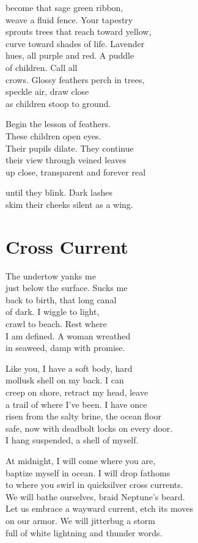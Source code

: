 \documentclass[twoside,10pt]{book}
\begin{document}
become that sage green ribbon,\\
weave a fluid fence. Your tapestry\\
sprouts trees that reach toward yellow,\\
curve toward shades of life. Lavender\\
hues, all purple and red. A puddle\\
of children. Call all\\
crows. Glossy feathers perch in trees,\\
speckle air, draw close\\
as children stoop to ground.

Begin the lesson of feathers.\\
These children open eyes.\\
Their pupils dilate. They continue\\
their view through veined leaves\\
up close, transparent and forever real

until they blink. Dark lashes\\
skim their cheeks silent as a wing.


\clearpage
\section{Cross Current}

The undertow yanks me\\
just below the surface. Sucks me\\
back to birth, that long canal\\
of dark. I wiggle to light,\\
crawl to beach. Rest where\\
I am defined. A woman wreathed\\
in seaweed, damp with promise.

Like you, I have a soft body, hard\\
mollusk shell on my back. I can\\
creep on shore, retract my head, leave\\
a trail of where I've been. I have once\\
risen from the salty brine, the ocean floor\\
safe, now with deadbolt locks on every door.\\
I hang suspended, a shell of myself.

At midnight, I will come where you are,\\
baptize myself in ocean. I will drop fathoms\\
to where you swirl in quicksilver cross currents.\\
We will bathe ourselves, braid Neptune's beard.\\
Let us embrace a wayward current, etch its moves\\
on our armor. We will jitterbug a storm\\
full of white lightning and thunder words.
\end{document}
